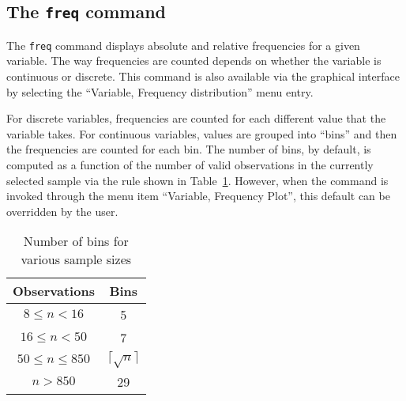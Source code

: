\subsection{The \texttt{freq} command}
\label{discr-freq}

The \texttt{freq} command displays absolute and relative frequencies
for a given variable. The way frequencies are counted depends on
whether the variable is continuous or discrete. This command is also
available via the graphical interface by selecting the ``Variable,
Frequency distribution'' menu entry.

For discrete variables, frequencies are counted for each different
value that the variable takes. For continuous variables, values are
grouped into ``bins'' and then the frequencies are counted for each
bin. The number of bins, by default, is computed as a function of the
number of valid observations in the currently selected sample via the
rule shown in Table~\ref{tab:bins}. However, when the command is
invoked through the menu item ``Variable, Frequency Plot'', this
default can be overridden by the user.

\begin{table}[htbp]
  \centering
  \begin{tabular}{cc}
\hline
  Observations & Bins \\
\hline
  $8 \le n < 16$ & 5 \\
  $16 \le n < 50 $ & 7 \\
  $50 \le n \le 850 $ & $\lceil \sqrt{n} \rceil$  \\
  $n > 850 $ & 29 \\
\hline
\end{tabular}
\caption{Number of bins for various sample sizes}
\label{tab:bins}
\end{table}

